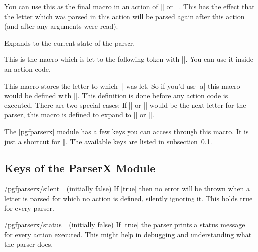 \begin{command}{\pgfparserxreinsert}
  You can use this as the final macro in an action of |\pgfparserxdef| or
  |\pgfparserxdefunknown|. This has the effect that the letter which was parsed
  in this action will be parsed again after this action (and after any arguments
  were read).
\end{command}

\begin{command}{\pgfparserxstate}
  Expands to the current state of the parser.
\end{command}

\begin{command}{\pgfparserxtoken}
  This is the macro which is let to the following token with |\futurelet|. You
  can use it inside an action code.
\end{command}

\begin{command}{\pgfparserxletter}
  This macro stores the letter to which |\pgfparserxtoken| was let. So if
  you'd use |a| this macro would be defined with
  |\def\pgfparserxletter{a}|. This definition is done before any action code is
  executed. There are two special cases: If |{| or |}| would be the next letter
  for the parser, this macro is defined to expand to |\bgroup| or |\egroup|.
\end{command}

\begin{command}{\pgfparserxset{}}
  The |pgfparserx| module has a few keys you can access through this macro. It
  is just a shortcut for ||. The available keys are
  listed in subsection~\ref{sec:parserx:keys}.
\end{command}

\subsection{Keys of the ParserX Module}\label{sec:parserx:keys}
\begin{key}{/pgfparserx/silent= (initially false)}
  If |true| then no error will be thrown when a letter is parsed for which no
  action is defined, silently ignoring it. This holds true for every parser.
\end{key}

\begin{key}{/pgfparserx/status= (initially false)}
  If |true| the parser prints a status message for every action executed. This
  might help in debugging and understanding what the parser does.
\end{key}

